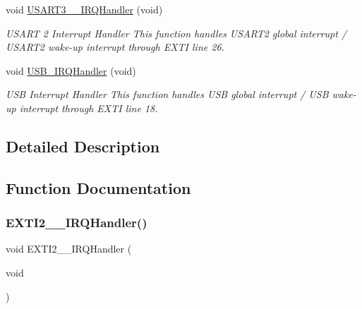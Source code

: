 \begin{DoxyCompactItemize}
void \mbox{\hyperlink{group___s_d___interrupt___functions_ga1aabaf02d0eafd24b4634143c04af37d}{U\+S\+A\+R\+T3\+\_\+\_\+\+I\+R\+Q\+Handler}} (void)
\begin{DoxyCompactList}\small\item\em U\+S\+A\+RT 2 Interrupt Handler This function handles U\+S\+A\+R\+T2 global interrupt / U\+S\+A\+R\+T2 wake-\/up interrupt through E\+X\+TI line 26. \end{DoxyCompactList}\item 
\mbox{\label{group___s_d___interrupt___functions_ga0fbd54f7ff4b48c5b9a900421adf3702}} 
void \mbox{\hyperlink{group___s_d___interrupt___functions_ga0fbd54f7ff4b48c5b9a900421adf3702}{U\+S\+B\+\_\+\+I\+R\+Q\+Handler}} (void)
\begin{DoxyCompactList}\small\item\em U\+SB Interrupt Handler This function handles U\+SB global interrupt / U\+SB wake-\/up interrupt through E\+X\+TI line 18. \end{DoxyCompactList}\end{DoxyCompactItemize}


\subsection{Detailed Description}


\subsection{Function Documentation}
\mbox{\label{group___s_d___interrupt___functions_gae00a10bd0f2f4c129c84120e78ad4382}} 
\subsubsection{\texorpdfstring{E\+X\+T\+I2\+\_\+\_\+\+I\+R\+Q\+Handler()}{EXTI2\_3\_IRQHandler()}}
{\footnotesize\ttfamily void E\+X\+T\+I2\+\_\+\_\+\+I\+R\+Q\+Handler (\begin{DoxyParamCaption}\item[{void}]{ }\end{DoxyParamCaption})}



